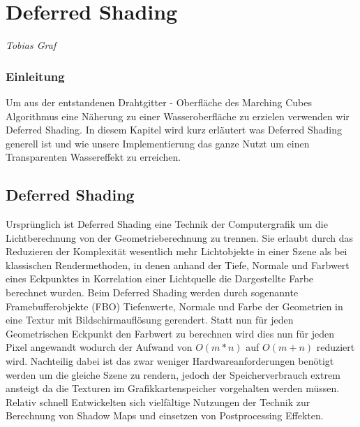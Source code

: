 \pagebreak
\section{Deferred Shading}

\begin{center}
\emph{{\small Tobias Graf}}
\end{center}

\bigskip

\subsubsection*{Einleitung} Um aus der entstandenen Drahtgitter - Oberfläche des Marching Cubes Algorithmus eine Näherung zu einer Wasseroberfläche zu erzielen verwenden wir Deferred Shading. In diesem Kapitel wird kurz erläutert was Deferred Shading generell ist und wie unsere Implementierung das ganze Nutzt um einen Transparenten Wassereffekt zu erreichen.

\subsection*{Deferred Shading} Ursprünglich ist Deferred Shading eine Technik der Computergrafik um die Lichtberechnung von der Geometrieberechnung zu trennen. Sie erlaubt durch das Reduzieren der Komplexität wesentlich mehr Lichtobjekte in einer Szene als bei klassischen Rendermethoden, in denen anhand der Tiefe, Normale und Farbwert eines Eckpunktes in Korrelation einer Lichtquelle die Dargestellte Farbe berechnet wurden. Beim Deferred Shading werden durch sogenannte Framebufferobjekte (FBO) Tiefenwerte, Normale und Farbe der Geometrien in eine Textur mit Bildschirmauflösung gerendert. Statt nun für jeden Geometrischen Eckpunkt den Farbwert zu berechnen wird dies nun für jeden Pixel angewandt wodurch der Aufwand von $O(m*n)$ auf $O(m+n)$ reduziert wird. Nachteilig dabei ist das zwar weniger Hardwareanforderungen benötigt werden um die gleiche Szene zu rendern, jedoch der Speicherverbrauch extrem ansteigt da die Texturen im Grafikkartenspeicher vorgehalten werden müssen.\\
Relativ schnell Entwickelten sich vielfältige Nutzungen der Technik zur Berechnung von Shadow Maps und einsetzen von Postprocessing Effekten.

